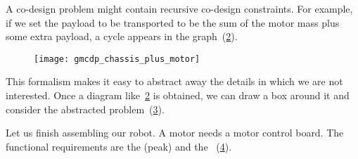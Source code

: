 \begin{example}
  \begin{figure}[h]
    \centering
    \caption{\label{fig:total_cost}}
  \end{figure}



  A co-design problem might contain recursive co-design constraints.
  For example, if we set the payload to be transported to be the sum
  of the motor mass plus some extra payload, a cycle appears in the
  graph~(\cref{fig:gmcdp_chassis_plus_motor}).


  \begin{figure}[h]
    \centering{}\texttt{[image: gmcdp\_chassis\_plus\_motor]}
    \caption{\label{fig:gmcdp_chassis_plus_motor}}
  \end{figure}

  \begin{center}
  \end{center}

  This formalism makes it easy to abstract away the details
  in which we are not interested. Once a diagram like~\cref{fig:gmcdp_chassis_plus_motor}
  is obtained, we can draw a box around it and consider the abstracted
  problem~(\cref{fig:gmcdp_chassis_plus_motor-1}).


  \begin{figure}[h!]
    \begin{center}
      \caption{\label{fig:gmcdp_chassis_plus_motor-1}}
    \end{center}
  \end{figure}


  \label{exa:finish}Let us finish assembling our robot. A motor needs
  a motor control board. The functional requirements are the (peak)
   and the ~(\cref{fig:mcb}).

  \begin{figure}[h]
    \centering
    \caption{\label{fig:mcb}}
  \end{figure}



\end{example}
